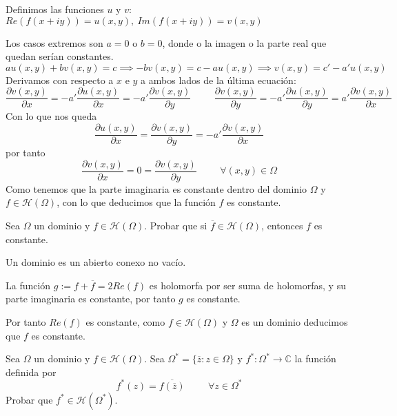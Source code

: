 \begin{sol}
	
	Definimos las funciones $u$ y $v$: 
	$Re(f(x+iy)) = u(x,y), \ Im(f(x+iy)) = v(x,y)$
	
	Los casos extremos son $a=0$ o $b=0$, donde o la imagen o la parte real que quedan serían constantes.
	$$au(x,y)+bv(x,y)=c \implies -bv(x,y) = c-au(x,y) \implies v(x,y)= c'-a'u(x,y)$$
	Derivamos con respecto a $x$ e $y$ a ambos lados de la última ecuación:
	$$\frac{\partial v(x,y)}{\partial x} = -a' \frac{\partial u(x,y)}{\partial x} = -a' \frac{\partial v(x,y)}{\partial y} \hspace{1cm} \frac{\partial v(x,y)}{\partial y} = -a' \frac{\partial u(x,y)}{\partial y} = a' \frac{\partial v(x,y)}{\partial x}$$
	Con lo que nos queda
	$$\frac{\partial u (x,y)}{\partial x} = \frac{\partial v(x,y)}{\partial y} = -a'\frac{\partial v(x,y)}{\partial x}$$
	por tanto
	$$\frac{\partial v(x,y)}{\partial x} = 0 = \frac{\partial v(x,y)}{\partial y} \hspace{1cm}\forall (x,y)\in\Omega$$
	Como tenemos que la parte imaginaria es constante dentro del dominio $\Omega$ y $f\in\mathcal{H}(\Omega)$, con lo que deducimos que la función $f$ es constante.
\end{sol}



\begin{ejer}
	Sea $\Omega$ un dominio y $f\in\mathcal{H}(\Omega)$. Probar que si $\overline{f}\in\mathcal{H}(\Omega)$, entonces $f$ es constante.
\end{ejer}


\begin{sol}
	
	Un dominio es un abierto conexo no vacío.
	
	La función $g := f+\overline{f} = 2Re(f)$ es holomorfa por ser suma de holomorfas, y su parte imaginaria es constante, por tanto $g$ es constante.
	
	Por tanto $Re(f)$ es constante, como $f\in\mathcal{H}(\Omega)$ y $ \Omega$ es un dominio deducimos que $f$ es constante.
\end{sol}





\begin{ejer}
	Sea $\Omega$ un dominio y $f\in\mathcal{H}(\Omega)$. Sea $\Omega^{\ast} = \{ \overline{z} : z\in\Omega \}$ y $f^{\ast}:\Omega^{\ast} \rightarrow \mathbb{C}$ la función definida por
	$$ f^{\ast}(z) = \overline{ f(\overline{z} ) } \hspace{1cm} \forall z\in\Omega^{\ast}$$
	Probar que $f^{\ast}\in\mathcal{H}(\Omega^{\ast})$.
\end{ejer}

